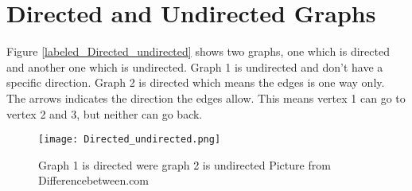 \section{Directed and Undirected Graphs}
Figure \cref{labeled_Directed_undirected} shows two graphs, one which is directed and another one which is undirected. Graph 1 is undirected and don't have a specific direction. Graph 2 is directed which means the edges is one way only. The arrows indicates the direction the edges allow. This means vertex 1 can go to vertex 2 and 3, but neither can go back. 


\begin{figure}[ht!]
    \centering
    \texttt{[image: Directed\_undirected.png]}
    \label{fig:labeled_Directed_undirected}
    \caption{Graph 1 is directed were graph 2 is undirected \newline Picture from Differencebetween.com \cite{dir_pic}}
  \end{figure}